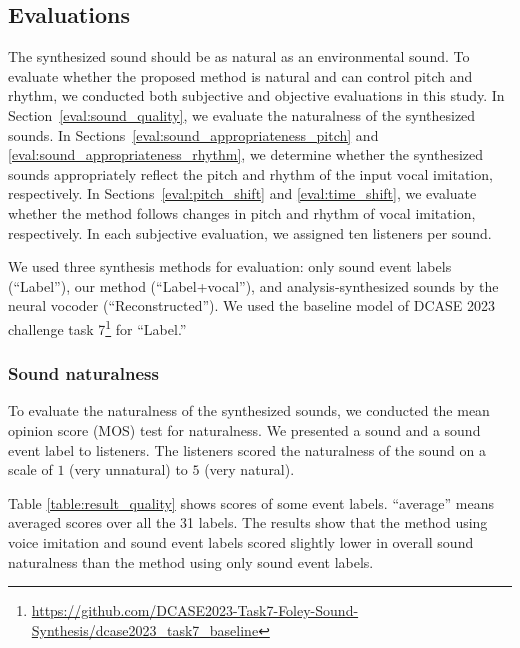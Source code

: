 \documentclass{article}
\begin{document}
\subsection{Evaluations}
\vspace{-3pt}
The synthesized sound should be as natural as an environmental sound.
To evaluate whether the proposed method is natural and can control pitch and rhythm, we conducted both subjective and objective evaluations in this study.
In Section~\ref{eval:sound_quality}, we evaluate the naturalness of the synthesized sounds.
In Sections~\ref{eval:sound_appropriateness_pitch} and \ref{eval:sound_appropriateness_rhythm}, we determine whether the synthesized sounds appropriately reflect the pitch and rhythm of the input vocal imitation, respectively.
In Sections~\ref{eval:pitch_shift} and \ref{eval:time_shift}, we evaluate whether the method follows changes in pitch and rhythm of vocal imitation, respectively.
In each subjective evaluation, we assigned ten listeners per sound.

We used three synthesis methods for evaluation: only sound event labels (``Label''), our method (``Label+vocal''), and analysis-synthesized sounds by the neural vocoder (``Reconstructed'').
We used the baseline model of DCASE 2023 challenge task 7\footnote{\scriptsize{\url{https://github.com/DCASE2023-Task7-Foley-Sound-Synthesis/dcase2023_task7_baseline}}} for ``Label.''




\vspace{-3pt}
\subsubsection{Sound naturalness}
\vspace{-3pt}
\label{eval:sound_quality}
To evaluate the naturalness of the synthesized sounds, we conducted the mean opinion score (MOS) test for naturalness.
We presented a sound and a sound event label to listeners. The listeners scored the naturalness of the sound on a scale of $1$ (very unnatural) to $5$ (very natural).

Table \ref{table:result_quality} shows scores of some event labels.
``average'' means averaged scores over all the 31 labels.
The results show that the method using voice imitation and sound event labels scored slightly lower in overall sound naturalness than the method using only sound event labels.
\end{document}
